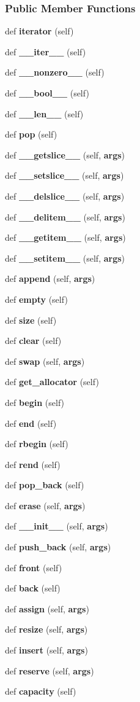 \subsubsection*{Public Member Functions}
\begin{DoxyCompactItemize}
\item 
def {\bf iterator} (self)
\item 
def {\bf \+\_\+\+\_\+iter\+\_\+\+\_\+} (self)
\item 
def {\bf \+\_\+\+\_\+nonzero\+\_\+\+\_\+} (self)
\item 
def {\bf \+\_\+\+\_\+bool\+\_\+\+\_\+} (self)
\item 
def {\bf \+\_\+\+\_\+len\+\_\+\+\_\+} (self)
\item 
def {\bf pop} (self)
\item 
def {\bf \+\_\+\+\_\+getslice\+\_\+\+\_\+} (self, {\bf args})
\item 
def {\bf \+\_\+\+\_\+setslice\+\_\+\+\_\+} (self, {\bf args})
\item 
def {\bf \+\_\+\+\_\+delslice\+\_\+\+\_\+} (self, {\bf args})
\item 
def {\bf \+\_\+\+\_\+delitem\+\_\+\+\_\+} (self, {\bf args})
\item 
def {\bf \+\_\+\+\_\+getitem\+\_\+\+\_\+} (self, {\bf args})
\item 
def {\bf \+\_\+\+\_\+setitem\+\_\+\+\_\+} (self, {\bf args})
\item 
def {\bf append} (self, {\bf args})
\item 
def {\bf empty} (self)
\item 
def {\bf size} (self)
\item 
def {\bf clear} (self)
\item 
def {\bf swap} (self, {\bf args})
\item 
def {\bf get\+\_\+allocator} (self)
\item 
def {\bf begin} (self)
\item 
def {\bf end} (self)
\item 
def {\bf rbegin} (self)
\item 
def {\bf rend} (self)
\item 
def {\bf pop\+\_\+back} (self)
\item 
def {\bf erase} (self, {\bf args})
\item 
def {\bf \+\_\+\+\_\+init\+\_\+\+\_\+} (self, {\bf args})
\item 
def {\bf push\+\_\+back} (self, {\bf args})
\item 
def {\bf front} (self)
\item 
def {\bf back} (self)
\item 
def {\bf assign} (self, {\bf args})
\item 
def {\bf resize} (self, {\bf args})
\item 
def {\bf insert} (self, {\bf args})
\item 
def {\bf reserve} (self, {\bf args})
\item 
def {\bf capacity} (self)
\end{DoxyCompactItemize}

